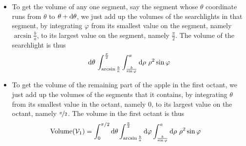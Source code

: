 \begin{eg}
\begin{itemize}
\item
To get the volume of any one segment, say the segment whose $\theta$ 
coordinate runs from $\theta$ to $\theta+\mathrm{d}\theta$, we just 
add up the volumes of the searchlights in that segment, by integrating 
$\varphi$ from its smallest value on the segment, namely $\arcsin\frac{b}{a}$, 
to its largest value on the segment, namely $\frac{\pi}{2}$. 
The volume of the searchlight is thus
\begin{align*}
\mathrm{d}\theta\,\int_{\arcsin\frac{b}{a}}^{\frac{\pi}{2}} 
              \int_{\frac{b}{\sin\varphi}}^a
               \mathrm{d}\rho\  \rho^2\sin\varphi
\end{align*}

\item
To get the volume of the remaining part of the apple in the first octant, 
we just add up the volumes of the segments that it contains, by integrating 
$\theta$ from its smallest value in the octant, namely $0$, to its largest value on the octant, namely  $\nicefrac{\pi}{2}$. The volume in the 
first octant is thus
\begin{align*}
\text{Volume}(\mathcal{V}_1)
&=\int_0^{\pi/2}\mathrm{d}\theta
         \int_{\arcsin\frac{b}{a}}^{\frac{\pi}{2}} \mathrm{d}\varphi
        \int_{\frac{b}{\sin\varphi}}^{a}
               \mathrm{d}\rho\  \rho^2\sin\varphi
\end{align*}


\end{itemize}
\end{eg}
